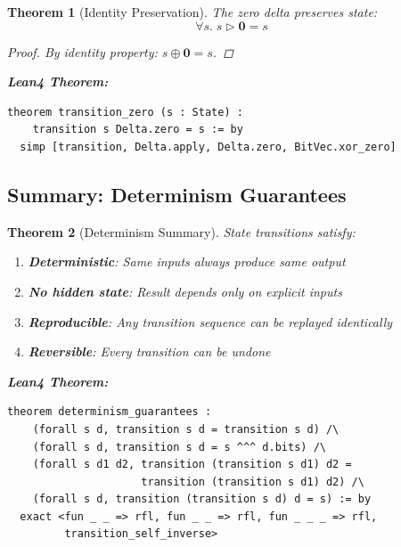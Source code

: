 \documentclass[11pt,letterpaper]{article}
\theoremstyle{plain}
\newtheorem{theorem}{Theorem}[section]
\theoremstyle{definition}
\theoremstyle{remark}
\newcommand{\dzero}{\mathbf{0}}          %
\newcommand{\transition}{\triangleright} %
\begin{document}
\begin{theorem}[Identity Preservation]
\label{thm:identity-pres}
The zero delta preserves state:
\[
\forall s.\; s \transition \dzero = s
\]

\begin{proof}
By identity property: $s \oplus \dzero = s$.
\end{proof}

\medskip
\noindent\textbf{Lean4 Theorem:}
\begin{lstlisting}
theorem transition_zero (s : State) :
    transition s Delta.zero = s := by
  simp [transition, Delta.apply, Delta.zero, BitVec.xor_zero]
\end{lstlisting}
\end{theorem}

\subsection{Summary: Determinism Guarantees}

\begin{theorem}[Determinism Summary]
\label{thm:determinism-summary}
State transitions satisfy:
\begin{enumerate}
    \item \textbf{Deterministic}: Same inputs always produce same output
    \item \textbf{No hidden state}: Result depends only on explicit inputs
    \item \textbf{Reproducible}: Any transition sequence can be replayed identically
    \item \textbf{Reversible}: Every transition can be undone
\end{enumerate}

\medskip
\noindent\textbf{Lean4 Theorem:}
\begin{lstlisting}
theorem determinism_guarantees :
    (forall s d, transition s d = transition s d) /\
    (forall s d, transition s d = s ^^^ d.bits) /\
    (forall s d1 d2, transition (transition s d1) d2 = 
                     transition (transition s d1) d2) /\
    (forall s d, transition (transition s d) d = s) := by
  exact <fun _ _ => rfl, fun _ _ => rfl, fun _ _ _ => rfl,
         transition_self_inverse>
\end{lstlisting}
\end{theorem}

\end{document}
